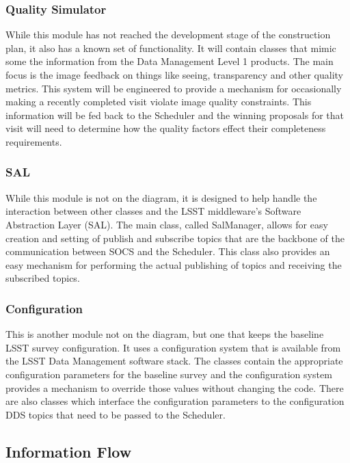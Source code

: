 \documentclass[]{spie}  %
\begin{document}
\subsubsection{Quality Simulator}

While this module has not reached the development stage of the construction plan, it also has a known set of functionality. It will contain classes that mimic some the information from the Data Management Level 1 products\cite{DPDD}. The main focus is the image feedback on things like seeing, transparency and other quality metrics. This system will be engineered to provide a mechanism for occasionally making a recently completed visit violate image quality constraints. This information will be fed back to the Scheduler and the winning proposals for that visit will need to determine how the quality factors effect their completeness requirements.

\subsubsection{SAL}

While this module is not on the diagram, it is designed to help handle the interaction between other classes and the LSST middleware's Software Abstraction Layer (SAL). The main class, called SalManager, allows for easy creation and setting of publish and subscribe topics that are the backbone of the communication between SOCS and the Scheduler. This class also provides an easy mechanism for performing the actual publishing of topics and receiving the subscribed topics.

\subsubsection{Configuration}

This is another module not on the diagram, but one that keeps the baseline LSST survey configuration. It uses a configuration system that is available from the LSST Data Management software stack\cite{2015arXiv151207914J}. The classes contain the appropriate configuration parameters for the baseline survey and the configuration system provides a mechanism to override those values without changing the code. There are also classes which interface the configuration parameters to the configuration DDS topics that need to be passed to the Scheduler.

\subsection{Information Flow}
\end{document}

